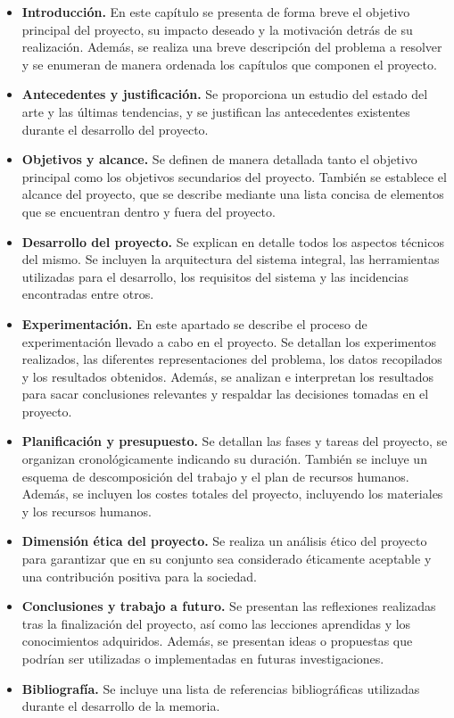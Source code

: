 \begin{itemize}
    \item \textbf{Introducción.} En este capítulo se presenta de forma breve el objetivo 
    principal del proyecto, su impacto deseado y la motivación detrás de su realización. 
    Además, se realiza una  breve descripción del problema a resolver y se enumeran de manera 
    ordenada los capítulos que componen el proyecto.
    \item \textbf{Antecedentes y justificación.} Se proporciona un estudio del estado del 
    arte y las últimas tendencias, y se justifican las antecedentes existentes durante el 
    desarrollo del proyecto.
    \item \textbf{Objetivos y alcance.} Se definen de manera detallada tanto el objetivo 
    principal como los objetivos secundarios del proyecto. También se establece el alcance 
    del proyecto, que se describe mediante una lista concisa de elementos que se encuentran 
    dentro y fuera del proyecto.
    \item \textbf{Desarrollo del proyecto.} Se explican en detalle todos los aspectos técnicos del mismo. 
    Se incluyen la arquitectura del sistema integral, las herramientas utilizadas para el desarrollo, 
    los requisitos del sistema y las incidencias encontradas entre otros.
    \item \textbf{Experimentación.} En este apartado se describe el proceso de experimentación 
    llevado a cabo en el proyecto. Se detallan los experimentos realizados, las diferentes
    representaciones del problema, los datos recopilados y los resultados obtenidos. Además, 
    se analizan e interpretan los resultados para sacar conclusiones relevantes y respaldar 
    las decisiones tomadas en el proyecto.  
    \item \textbf{Planificación y presupuesto.} Se detallan las fases y tareas del proyecto, se organizan 
    cronológicamente indicando su duración. También se incluye un esquema de descomposición 
    del trabajo y el plan de recursos humanos. Además, se incluyen los costes totales del proyecto, 
    incluyendo los materiales y los recursos humanos.
    \item \textbf{Dimensión ética del proyecto.} Se realiza un análisis ético del proyecto 
    para garantizar que en su conjunto sea considerado éticamente aceptable y una contribución positiva 
    para la sociedad.
    \item \textbf{Conclusiones y trabajo a futuro.} Se presentan las reflexiones realizadas 
    tras la finalización del proyecto, así como las lecciones aprendidas y los conocimientos 
    adquiridos. Además, se presentan ideas o propuestas que podrían ser utilizadas o implementadas 
    en futuras investigaciones.
    \item \textbf{Bibliografía.} Se incluye una lista de referencias bibliográficas utilizadas
    durante el desarrollo de la memoria.

\end{itemize}



\pagebreak